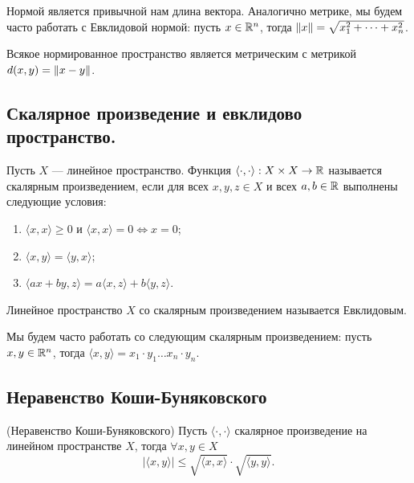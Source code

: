 \documentclass[a4paper]{article}
\theoremstyle{named}
\begin{document}
    Нормой является привычной нам длина вектора. Аналогично метрике, мы будем часто работать с Евклидовой нормой: пусть $x \in \mathbb{R}^n$, тогда $\left\lVert x\right\rVert = \sqrt{x_1^2 + \dots + x_n^2}$.

    Всякое нормированное пространство является метрическим с метрикой $d(x, y) = \left\lVert x - y\right\rVert$.

    \subsection{Скалярное произведение и евклидово пространство.}

    \begin{definition*}
        Пусть $X$ --- линейное пространство. Функция $\langle \cdot, \cdot \rangle: X \times X \to \mathbb{R}$ называется скалярным произведением, если для всех $x, y, z \in X$ и всех $a, b \in \mathbb{R}$ выполнены следующие условия:
        \begin{enumerate}
        \item $\langle x, x \rangle \geq 0$ и $\langle x, x \rangle = 0 \iff x = 0$;
        \item $\langle x, y \rangle = \langle y, x \rangle$;
        \item $\langle ax + by, z \rangle = a \langle x, z \rangle + b \langle y, z \rangle$.
        \end{enumerate}

        Линейное пространство $X$ со скалярным произведением называется Евклидовым.
    \end{definition*}

    Мы будем часто работать со следующим скалярным произведением: пусть $x, y \in \mathbb{R}^n$, тогда $\langle x, y \rangle = x_1 \cdot y_1 \dots x_n \cdot y_n$.

    \subsection{Неравенство Коши-Буняковского}

    \begin{lemma*} (Неравенство Коши-Буняковского) 
        Пусть $\langle \cdot, \cdot \rangle$ скалярное произведение на линейном пространстве $X$, тогда $\forall x, y \in X$
        \begin{equation*}
            |\langle x, y \rangle| \leq \sqrt{\langle x, x \rangle} \cdot \sqrt{\langle y, y \rangle}.
        \end{equation*}
    \end{lemma*}
\end{document}
